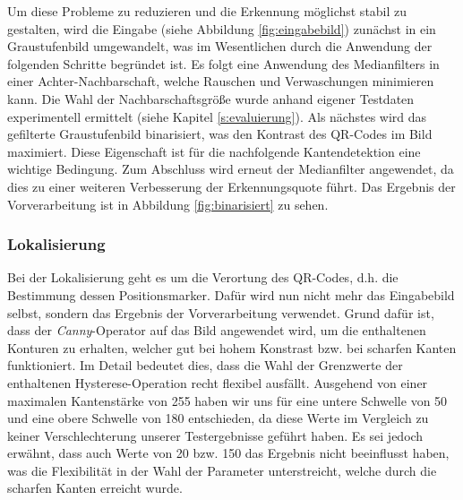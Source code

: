 \documentclass[a4paper, oneside, 12pt]{article}
\begin{document}
Um diese Probleme zu reduzieren und die Erkennung möglichst stabil zu gestalten, wird die Eingabe (siehe Abbildung \ref{fig:eingabebild}) zunächst in ein Graustufenbild umgewandelt, was im Wesentlichen durch die Anwendung der folgenden Schritte begründet ist.
Es folgt eine Anwendung des Medianfilters in einer Achter-Nachbarschaft, welche Rauschen und Verwaschungen minimieren kann. Die Wahl der Nachbarschaftsgröße wurde anhand eigener Testdaten experimentell ermittelt (siehe Kapitel \ref{s:evaluierung}).
Als nächstes wird das gefilterte Graustufenbild binarisiert, was den Kontrast des QR-Codes im Bild maximiert. Diese Eigenschaft ist für die nachfolgende Kantendetektion eine wichtige Bedingung.
Zum Abschluss wird erneut der Medianfilter angewendet, da dies zu einer weiteren Verbesserung der Erkennungsquote führt.
Das Ergebnis der Vorverarbeitung ist in Abbildung \ref{fig:binarisiert} zu sehen.

\subsubsection{Lokalisierung}

Bei der Lokalisierung geht es um die Verortung des QR-Codes, d.h. die Bestimmung dessen Positionsmarker. Dafür wird nun nicht mehr das Eingabebild selbst, sondern das Ergebnis der Vorverarbeitung verwendet.
Grund dafür ist, dass der \emph{Canny}-Operator \cite{canny1986computational} auf das Bild angewendet wird, um die enthaltenen Konturen zu erhalten, welcher gut bei hohem Konstrast bzw. bei scharfen Kanten funktioniert. Im Detail bedeutet dies, dass die Wahl der Grenzwerte der enthaltenen Hysterese-Operation recht flexibel ausfällt. Ausgehend von einer maximalen Kantenstärke von 255 haben wir uns für eine untere Schwelle von 50 und eine obere Schwelle von 180 entschieden, da diese Werte im Vergleich zu keiner Verschlechterung unserer Testergebnisse geführt haben. Es sei jedoch erwähnt, dass auch Werte von 20 bzw. 150 das Ergebnis nicht beeinflusst haben, was die Flexibilität in der Wahl der Parameter unterstreicht, welche durch die scharfen Kanten erreicht wurde.
\end{document}
